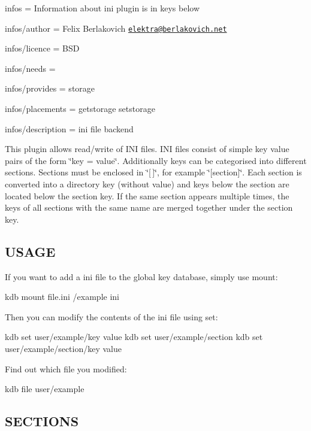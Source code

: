 
\begin{DoxyItemize}
\item infos = Information about ini plugin is in keys below
\item infos/author = Felix Berlakovich \href{mailto:elektra@berlakovich.net}{\tt elektra@berlakovich.\+net}
\item infos/licence = B\+S\+D
\item infos/needs =
\item infos/provides = storage
\item infos/placements = getstorage setstorage
\item infos/description = ini file backend
\end{DoxyItemize}

This plugin allows read/write of I\+N\+I files. I\+N\+I files consist of simple key value pairs of the form \char`\"{}key = value\char`\"{}. Additionally keys can be categorised into different sections. Sections must be enclosed in \char`\"{}\mbox{[}$\,$\mbox{]}\char`\"{}, for example \char`\"{}\mbox{[}section\mbox{]}\char`\"{}. Each section is converted into a directory key (without value) and keys below the section are located below the section key. If the same section appears multiple times, the keys of all sections with the same name are merged together under the section key.

\subsection*{U\+S\+A\+G\+E}

If you want to add a ini file to the global key database, simply use mount\+: \begin{DoxyVerb}kdb mount file.ini /example ini
\end{DoxyVerb}


Then you can modify the contents of the ini file using set\+: \begin{DoxyVerb}kdb set user/example/key value
kdb set user/example/section
kdb set user/example/section/key value
\end{DoxyVerb}


Find out which file you modified\+: \begin{DoxyVerb}kdb file user/example
\end{DoxyVerb}


\subsection*{S\+E\+C\+T\+I\+O\+N\+S}

